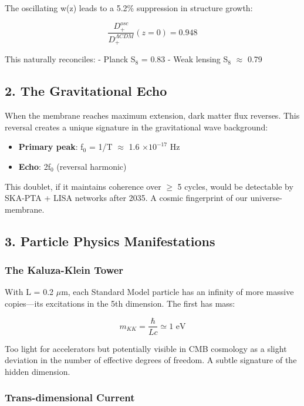 \documentclass[
  11pt,
]{report}
\providecommand{\tightlist}{%
  \setlength{\itemsep}{0pt}\setlength{\parskip}{0pt}}
\begin{document}
The oscillating w(z) leads to a 5.2\% suppression in structure growth:

\[\frac{D_+^{osc}}{D_+^{ΛCDM}}(z=0) = 0.948\]

This naturally reconciles: - Planck S\(_8\) = 0.83 - Weak lensing
S\(_8\) \(\approx\) 0.79

\subsection{2. The Gravitational Echo}\label{the-gravitational-echo}

When the membrane reaches maximum extension, dark matter flux reverses.
This reversal creates a unique signature in the gravitational wave
background:

\begin{itemize}
\tightlist
\item
  \textbf{Primary peak}: f\(_0\) = 1/T \(\approx\) 1.6
  \(\times 10^{-17}\) Hz
\item
  \textbf{Echo}: 2f\(_0\) (reversal harmonic)
\end{itemize}

This doublet, if it maintains coherence over \(\geq\) 5 cycles, would be
detectable by SKA-PTA + LISA networks after 2035. A cosmic fingerprint
of our universe-membrane.

\subsection{3. Particle Physics
Manifestations}\label{particle-physics-manifestations-1}

\subsubsection{The Kaluza-Klein Tower}\label{the-kaluza-klein-tower-1}

With L = 0.2 \(\mu\)m, each Standard Model particle has an infinity of
more massive copies---its excitations in the 5th dimension. The first
has mass:

\[m_{KK} = \frac{\hbar}{Lc} \simeq 1 \text{ eV}\]

Too light for accelerators but potentially visible in CMB cosmology as a
slight deviation in the number of effective degrees of freedom. A subtle
signature of the hidden dimension.

\subsubsection{Trans-dimensional
Current}\label{trans-dimensional-current}
\end{document}
